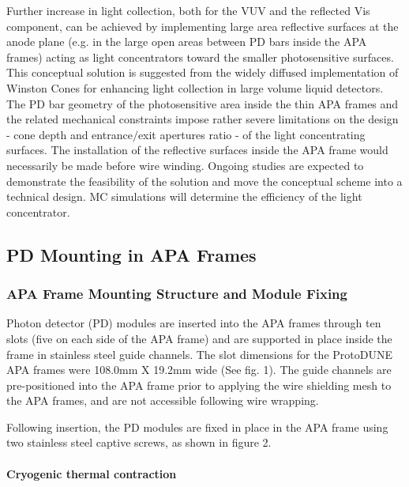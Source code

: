 Further increase in light collection, both for the VUV and the reflected Vis component, can be achieved by implementing large area reflective surfaces 
at the anode plane (e.g. in the large open areas between PD bars inside the APA frames) acting as light concentrators toward the smaller photosensitive surfaces.  
This conceptual solution is suggested from the widely diffused implementation of Winston Cones for enhancing light collection in large volume liquid detectors. 
The PD bar geometry of the photosensitive area inside the thin APA frames and the related mechanical constraints impose rather severe limitations 
on the design - cone depth and entrance$/$exit apertures ratio - of the light concentrating surfaces. The installation of the reflective surfaces inside the APA frame would necessarily be made before wire winding. 
Ongoing studies are expected to demonstrate the feasibility of the solution and move the conceptual scheme into a technical design. MC simulations will determine the efficiency of the light concentrator. 




\subsection{PD Mounting in APA Frames}
\label{sec:fdsp-pd-assy-frames}

\subsubsection{APA Frame Mounting Structure and Module Fixing}	
Photon detector (PD) modules are inserted into the APA frames through ten slots 
(five on each side of the APA frame) and are supported in place inside the frame in 
stainless steel guide channels.  The slot dimensions for the ProtoDUNE APA frames 
were 108.0mm X 19.2mm wide (See fig. 1).  The guide channels are pre-positioned into 
the APA frame prior to applying the wire shielding mesh to the APA frames, and are
not accessible following wire wrapping.


Following insertion, the PD modules are fixed in place in the APA frame using
 two stainless steel captive screws, as shown in figure 2.


\paragraph{Cryogenic thermal contraction}

